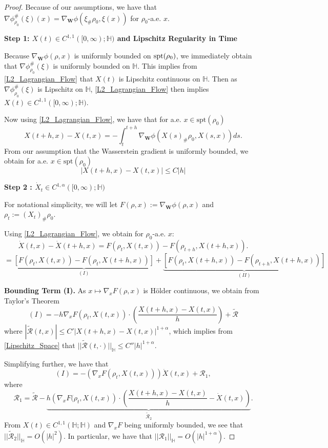 \documentclass[11pt,a4paper]{amsart}
\newcommand{\1}{\mathds{1}}
\newcommand{\spt}{{\rm{spt}}}
\numberwithin{equation}{section}
\begin{document}
\begin{proof} Because of our assumptions, we have that $\nabla \phi^{\#}_{\rho_0}(\xi)(x) = \nabla_{\mathbf{W}} \phi(\xi_{\#} \rho_0,\xi(x))$ for $\rho_0$-a.e. $x$. \smallskip

\textbf{Step 1: $X(t) \in C^{1,1}([0,\infty);\mathbb{H})$ and Lipschitz Regularity in Time} 
\smallskip

Because $\nabla_{\mathbf{W}} \phi(\rho,x)$ is uniformly bounded on $\spt(\rho_0)$, we immediately obtain that $\nabla \phi^{\#}_{\rho_0}(\xi)$ is uniformly bounded on $\mathbb{H}$. This implies from \eqref{L2_Lagrangian_Flow} that $X(t)$ is Lipschitz continuous on $\mathbb{H}$. Then as $\nabla \phi^{\#}_{\rho_0}(\xi)$ is Lipschitz on $\mathbb{H}$, \eqref{L2_Lagrangian_Flow}  then implies $X(t) \in C^{1,1}([0,\infty);\mathbb{H})$. \smallskip

Now using \eqref{L2_Lagrangian_Flow}, we have that for a.e. $x \in \text{spt}(\rho_0)$
\[ X(t+h,x) - X(t,x) = -\int_{t}^{t+h} \nabla_{\mathbf{W}} \phi( X(s)_{\#} \rho_0,X(s,x)) ds.   \] From our assumption that the Wasserstein gradient is uniformly bounded, we obtain for a.e. $x \in \text{spt}(\rho_0)$
\begin{equation} |X(t+h,x) -X(t,x)| \leq C|h| \label{Lipschitz_Space} \end{equation}

\textbf{Step 2 : $\dot{X}_t \in C^{1,\alpha}([0,\infty);\mathbb{H})$} \smallskip

For notational simplicity, we will let $F(\rho,x) := \nabla_{\mathbf{W}} \phi(\rho,x)$ and $\rho_t := (X_t)_{\#} \rho_0$.   \smallskip

 Using \eqref{L2_Lagrangian_Flow}, we obtain for $\rho_0$-a.e. $x$:
\[
\dot{X}(t,x)-\dot{X}(t+h,x) = F(\rho_t,X(t,x))- F(\rho_{t+h},X(t+h,x)).
\]
\[ = \underbrace{\left[ F(\rho_t,X(t,x)) - F(\rho_t,X(t+h,x)) \right]}_{(I)} + \underbrace{[ F(\rho_t,X(t+h,x))-F(\rho_{t+h},X(t+h,x)) ]}_{(II)} \]

\textbf{Bounding Term (I).} As $x\mapsto \nabla_x F(\rho,x)$ is Hölder continuous, we obtain from Taylor's Theorem
\[
(I) = -h\nabla_x F(\rho_t,X(t,x)) \cdot(\frac{X(t+h,x)-X(t,x)}{h}) + \tilde{\mathcal{R}}
\] where $|\tilde{\mathcal{R}}(t,x)| \leq C' |X(t+h,x)-X(t,x)|^{1+\alpha}$, which implies from \eqref{Lipschitz_Space} that $||\tilde{\mathcal{R}}(t,\cdot)||_{\mathbb{H}} \leq C'' |h|^{1+\alpha}$. \smallskip

Simplifying further, we have that
\[ (I) =-\left( \nabla_x F(\rho_t,X(t,x)) \right)  \dot{X}(t,x) + \mathcal{R}_1,\] where
\[ \mathcal{R}_1 = \tilde{\mathcal{R}}  -\underbrace{h\left( \nabla_x F(\rho_t,X(t,x) \right) \cdot \left( \frac{X(t+h,x)-X(t,x)}{h}  - \dot{X}(t,x)
 \right)}_{\tilde{\mathcal{R}}_2}.   \] From $X(t) \in C^{1,1}(\mathbb{H};\mathbb{H})$ and $\nabla_x F$ being uniformly bounded, we see that $||\tilde{\mathcal{R}}_2||_{\mathbb{H}} = O(|h|^2)$. In particular, we have that $||\mathcal{R}_1||_{\mathbb{H}} = O(|h|^{1+\alpha})$. \smallskip


\end{proof}
\end{document}
